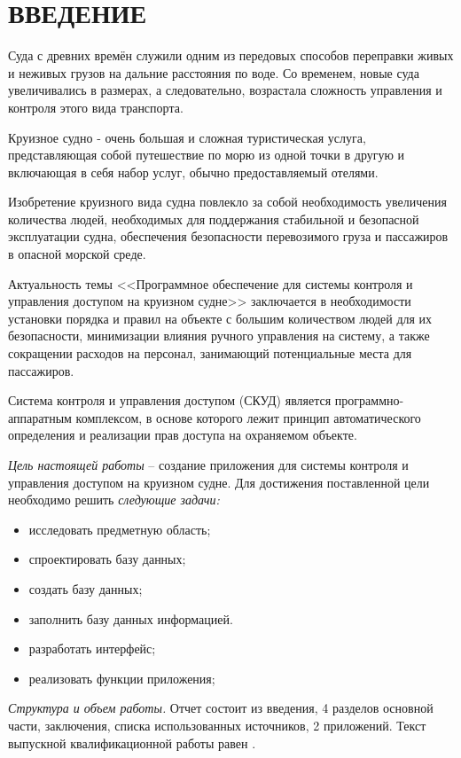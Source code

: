 \section*{ВВЕДЕНИЕ}
Суда с древних времён служили одним из передовых способов переправки живых и неживых грузов на дальние расстояния по воде. Со временем, новые суда увеличивались в размерах, а следовательно, возрастала сложность управления и контроля этого вида транспорта.

Круизное судно - очень большая и сложная туристическая услуга, представляющая собой путешествие по морю из одной точки в другую и включающая в себя набор услуг, обычно предоставляемый отелями.

Изобретение круизного вида судна повлекло за собой необходимость увеличения количества людей, необходимых для поддержания стабильной и безопасной эксплуатации судна, обеспечения безопасности перевозимого груза и пассажиров в опасной морской среде.

Актуальность темы <<Программное обеспечение для системы контроля и управления доступом на круизном судне>> заключается в необходимости установки порядка и правил на объекте с большим количеством людей для их безопасности, минимизации влияния ручного управления на систему, а также сокращении расходов на персонал, занимающий потенциальные места для пассажиров.

Система контроля и управления доступом (СКУД) является программно-аппаратным комплексом, в основе которого лежит принцип автоматического определения и реализации прав доступа на охраняемом объекте.

\emph{Цель настоящей работы} – создание приложения для системы контроля и управления доступом на круизном судне. Для достижения поставленной цели необходимо решить \emph{следующие задачи:}
\begin{itemize}
\item исследовать предметную область;
\item спроектировать базу данных;
\item создать базу данных;
\item заполнить базу данных информацией.
\item разработать  интерфейс;
\item реализовать функции приложения;
\end{itemize}

\emph{Структура и объем работы.} Отчет состоит из введения, 4 разделов основной части, заключения, списка использованных источников, 2 приложений. Текст выпускной квалификационной работы равен .

